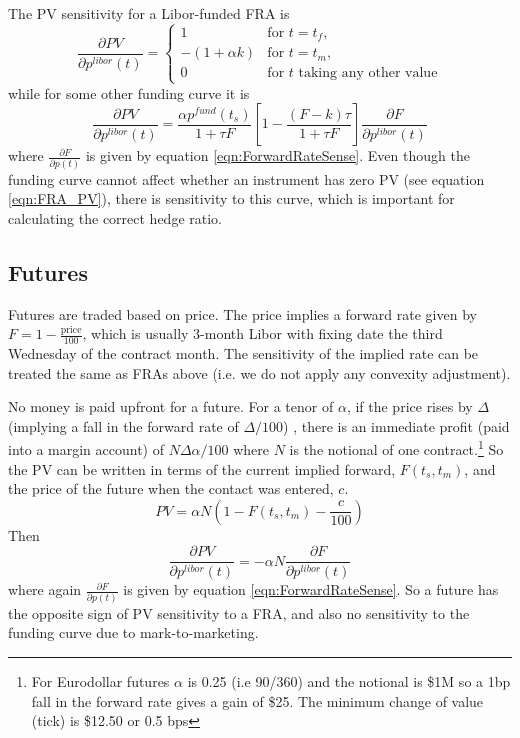The PV sensitivity for a Libor-funded FRA is 
\begin{equation}
\frac{\partial PV}{\partial p^{libor}(t)}=
\begin{cases}
 1& \text{for } t=t_{f},\\
  -(1+\alpha k)  & \text{for } t=t_{m},\\
 0 & \text{for $t$ taking any other value}
 \end{cases}
\end{equation}
%
while for some other funding curve it is 
\begin{equation}
\frac{\partial PV}{\partial p^{libor}(t)}=\frac{\alpha p^{fund}(t_s)}{1+\tau F}\left[ 1-\frac{(F-k)\tau}{1+\tau F}  \right] \frac{\partial F}{\partial p^{libor}(t)}
\end{equation}
where $\frac{\partial F}{\partial p(t)}$ is given by equation \ref{eqn:ForwardRateSense}.  Even though the funding curve cannot affect whether an instrument has zero PV (see equation \ref{eqn:FRA_PV}), there is sensitivity to this curve, which is important for calculating the correct hedge ratio. 

\subsection{Futures}
Futures are traded based on price. The price implies a forward  rate given by $F = 1-\frac{\text{price}}{100}$, which is usually 3-month Libor with fixing date the third Wednesday of the contract month. The sensitivity of the implied rate can be treated the same as FRAs above  (i.e. we do not apply any convexity adjustment). 

No money is paid upfront for a future. For a tenor of $\alpha$, if the price rises by $\Delta$ (implying a fall in the forward rate of $\Delta/100$) , there is an immediate profit (paid into a margin account) of $N\Delta \alpha/100$ where $N$ is the notional of one contract.\footnote{For Eurodollar futures  $\alpha$ is 0.25 (i.e 90/360) and the notional is \$1M so a 1bp fall in the forward rate gives a gain of \$25. The minimum change of value (tick) is \$12.50 or 0.5 bps}
So the PV can be written in terms of the current implied forward, $F(t_s,t_m)$, and the price of the future when  the contact was entered, $c$.
%
\begin{equation}
PV = \alpha N\left(1-F(t_s,t_m) -\frac{c}{100}\right)
\end{equation}
%
Then
\begin{equation}
\frac{\partial PV}{\partial p^{libor}(t)}=-\alpha N\frac{\partial F}{\partial p^{libor}(t)}
\end{equation}
%
where again $\frac{\partial F}{\partial p(t)}$ is given by equation \ref{eqn:ForwardRateSense}. So a future has the opposite sign of PV sensitivity to a FRA, and also no sensitivity to the funding curve due to mark-to-marketing. 


